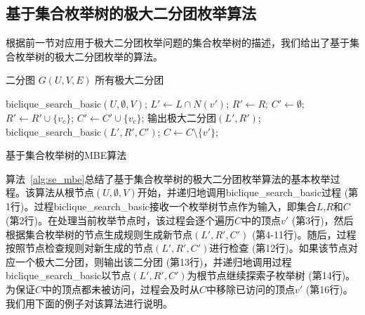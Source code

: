 \subsection{基于集合枚举树的极大二分团枚举算法}
\label{subsec:algorithm}
根据前一节对应用于极大二分团枚举问题的集合枚举树的描述，我们给出了基于集合枚举树的极大二分团枚举的算法。

\begin{algorithm}[H]
    \begin{algorithmic}[1]
        \normalsize
        \REQUIRE 二分图 $G(U,V,E)$
        \ENSURE 所有极大二分团
        
        \renewcommand{\algorithmicwhile}{\textbf{procedure}}
        \renewcommand{\algorithmicdo}{\textbf{:}}


        \STATE \textsf{biclique\_search\_basic}$(U,\emptyset,V)$;
        \renewcommand{\algorithmicdo}{\textbf{do}}
            \STATE $L' \leftarrow L \cap N(v')$; $R'\leftarrow R$; $C' \leftarrow \emptyset$;
                \STATE $R' \leftarrow R' \cup \{v_c\}$;
                \STATE $C' \leftarrow C' \cup \{v_c\}$;
              \ENDIF
            \ENDFOR
              \STATE 输出极大二分团$(L', R')$;
              \STATE \textsf{biclique\_search\_basic}$(L',R',C')$;
            \ENDIF
            \STATE $C \leftarrow C \setminus \{v'\}; $
          \ENDFOR

        \ENDWHILE

    \end{algorithmic}
    \caption{基于集合枚举树的MBE算法}
    \label{alg:se_mbe}
\end{algorithm}

算法~\ref{alg:se_mbe}总结了基于集合枚举树的极大二分团枚举算法的基本枚举过程。该算法从根节点$(U,\emptyset,V)$开始，并递归地调用\textsf{biclique\_search\_basic}过程 (第1行)。过程\textsf{biclique\_search\_basic}接收一个枚举树节点作为输入，即集合$L$,$R$和$C$ (第2行)。在处理当前枚举节点时，该过程会逐个遍历$C$中的顶点$v'$ (第3行)，然后根据集合枚举树的节点生成规则生成新节点$(L',R',C')$ (第4-11行)。随后，过程按照节点检查规则对新生成的节点$(L',R',C')$进行检查 (第12行)。如果该节点对应一个极大二分团，则输出该二分团 (第13行)，并递归地调用过程\textsf{biclique\_search\_basic}以节点$(L',R',C')$为根节点继续探索子枚举树 (第14行)。为保证$C$中的顶点都未被访问，过程会及时从$C$中移除已访问的顶点$v'$ (第16行)。我们用下面的例子对该算法进行说明。


